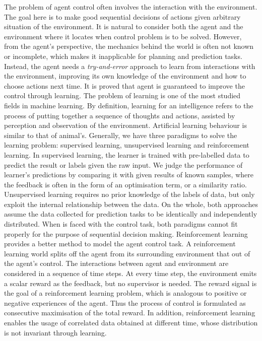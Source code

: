 \documentclass[oneside,11pt,a4paper]{article}
\begin{document}
The problem of agent control often involves the interaction with the environment. The goal here is to make good sequential decisions of actions given arbitrary situation of the environment. It is natural to consider both the agent and the environment where it locates when control problem is to be solved. However, from the agent's perspective, the mechanics behind the world is often not known or incomplete, which makes it inapplicable for planning and prediction tasks. Instead, the agent needs a \textit{try-and-error} approach to learn from interactions with the environment, improving its own knowledge of the environment and how to choose actions next time. It is proved that agent is guaranteed to improve the control through learning.
\newline
\newline
\noindent
The problem of learning is one of the most studied fields in machine learning. By definition, learning for an intelligence refers to the process of putting together a sequence of thoughts and actions, assisted by perception and observation of the environment. Artificial learning behaviour is similar to that of animal's. Generally, we have three paradigms to solve the learning problem: supervised learning, unsupervised learning and reinforcement learning. In supervised learning, the learner is trained with pre-labelled data to predict the result or labels given the raw input. We judge the performance of learner's predictions by comparing it with given results of known samples, where the feedback is often in the form of an optimisation term, or a similarity ratio. Unsupervised learning requires no prior knowledge of the labels of data, but only exploit the internal relationship between the data. On the whole, both approaches assume the data collected for prediction tasks to be identically and independently distributed. When is faced with the control task, both paradigms cannot fit properly for the purpose of sequential decision making.
\newline
\newline
\noindent
Reinforcement learning provides a better method to model the agent control task. A reinforcement learning world splits off the agent from its surrounding environment that out of the agent's control. The interactions between agent and environment are considered in a sequence of time steps. At every time step, the environment emits a scalar reward as the feedback, but no supervisor is needed. The reward signal is the goal of a reinforcement learning problem, which is analogous to positive or negative experiences of the agent. Thus the process of control is formulated as consecutive maximisation of the total reward. In addition, reinforcement learning enables the usage of correlated data obtained at different time, whose distribution is not invariant through learning.
\end{document}
